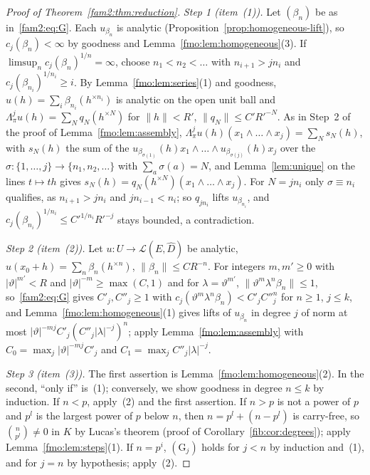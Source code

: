 \documentclass[11pt]{amsart}
\theoremstyle{definition}
\theoremstyle{remark}
\numberwithin{equation}{section}
\newcommand{\cL}{\mathcal L}
\newcommand{\abs}[1]{\lvert #1\rvert}
\newcommand{\norm}[1]{\lVert #1\rVert}
\theoremstyle{plain}
\theoremstyle{definition}
\theoremstyle{plain}
\begin{document}
\begin{proof}[Proof of Theorem~\ref{fam2:thm:reduction}]
\emph{Step 1 (item~(1)).} Let $(\beta_n)$ be as in~\eqref{fam2:eq:G}. Each $u_{\beta_n}$ is analytic
(Proposition~\ref{prop:homogeneous-lift}), so $c_j(\beta_n)<\infty$ by goodness and Lemma~\ref{fmo:lem:homogeneous}(3). If
$\limsup_nc_j(\beta_n)^{1/n}=\infty$, choose $n_1<n_2<\dots$ with $n_{i+1}>jn_i$ and $c_j(\beta_{n_i})^{1/n_i}\ge i$. By
Lemma~\ref{fmo:lem:series}(1) and goodness, $u(h)=\sum_i\beta_{n_i}(h^{\times n_i})$ is analytic on the open unit ball and
$\Lambda^j_\pi u(h)=\sum_Nq_N(h^{\times N})$ for $\norm h<R'$, $\norm{q_N}\le C'R'^{-N}$. As in Step~2 of the proof of
Lemma~\ref{fmo:lem:assembly}, $\Lambda^j_\pi u(h)(x_1\wedge\dots\wedge x_j)=\sum_Ns_N(h)$, with $s_N(h)$ the sum of the
$u_{\beta_{\sigma(1)}}(h)x_1\wedge\dots\wedge u_{\beta_{\sigma(j)}}(h)x_j$ over the $\sigma\colon\{1,\dots,j\}\to
\{n_1,n_2,\dots\}$ with $\sum_a\sigma(a)=N$, and Lemma~\ref{lem:unique} on the lines $t\mapsto th$ gives
$s_N(h)=q_N(h^{\times N})(x_1\wedge\dots\wedge x_j)$. For $N=jn_i$ only $\sigma\equiv n_i$ qualifies, as $n_{i+1}>jn_i$
and $jn_{i-1}<n_i$; so $q_{jn_i}$ lifts $u_{\beta_{n_i}}$, and $c_j(\beta_{n_i})^{1/n_i}\le C'^{1/n_i}R'^{-j}$ stays
bounded, a contradiction.

\emph{Step 2 (item~(2)).} Let $u\colon U\to\cL(E,\widehat D)$ be analytic, $u(x_0+h)=\sum_n\beta_n(h^{\times n})$,
$\norm{\beta_n}\le CR^{-n}$. For integers $m,m'\ge0$ with $\abs\vartheta^{m'}<R$ and $\abs\vartheta^{-m}\ge\max(C,1)$ and for
$\lambda=\vartheta^{m'}$, $\norm{\vartheta^m\lambda^n\beta_n}\le1$, so~\eqref{fam2:eq:G} gives $C'_j,C''_j\ge1$ with
$c_j(\vartheta^m\lambda^n\beta_n)<C'_jC''^n_j$ for $n\ge1$, $j\le k$, and Lemma~\ref{fmo:lem:homogeneous}(1) gives lifts of
$u_{\beta_n}$ in degree $j$ of norm at most $\abs\vartheta^{-mj}C'_j(C''_j\abs\lambda^{-j})^n$; apply
Lemma~\ref{fmo:lem:assembly} with $C_0=\max_j\abs\vartheta^{-mj}C'_j$ and $C_1=\max_jC''_j\abs\lambda^{-j}$.

\emph{Step 3 (item~(3)).} The first assertion is Lemma~\ref{fmo:lem:homogeneous}(2). In the second, ``only if'' is~(1);
conversely, we show goodness in degree $n\le k$ by induction. If $n<p$, apply~(2) and the first assertion. If $n>p$ is not
a power of $p$ and $p^l$ is the largest power of $p$ below $n$, then $n=p^l+(n-p^l)$ is carry-free, so $\binom n{p^l}\ne0$
in $K$ by Lucas's theorem (proof of Corollary~\ref{fib:cor:degrees}); apply Lemma~\ref{fmo:lem:steps}(1). If $n=p^i$,
$(\mathrm G_j)$ holds for $j<n$ by induction and~(1), and for $j=n$ by hypothesis; apply~(2).


\end{proof}
\end{document}
